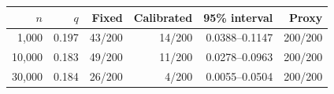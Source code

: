 \begin{tabular}{@{}rrrrrr@{}}
\toprule
$n$ & $q$ & Fixed & Calibrated & 95\% interval & Proxy \\
\midrule
1,000 & 0.197 & 43/200 & 14/200 & 0.0388--0.1147 & 200/200 \\
10,000 & 0.183 & 49/200 & 11/200 & 0.0278--0.0963 & 200/200 \\
30,000 & 0.184 & 26/200 & 4/200 & 0.0055--0.0504 & 200/200 \\
\bottomrule
\end{tabular}
